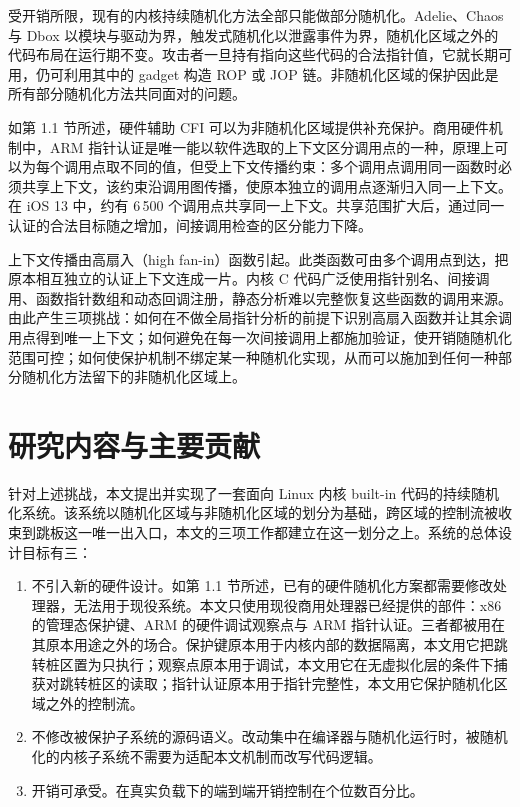 受开销所限，现有的内核持续随机化方法全部只能做部分随机化。Adelie、Chaos 与 Dbox 以模块与驱动为界，触发式随机化以泄露事件为界，随机化区域之外的代码布局在运行期不变。攻击者一旦持有指向这些代码的合法指针值，它就长期可用，仍可利用其中的 gadget 构造 ROP 或 JOP 链。非随机化区域的保护因此是所有部分随机化方法共同面对的问题。

如第 1.1 节所述，硬件辅助 CFI 可以为非随机化区域提供补充保护。商用硬件机制中，ARM 指针认证是唯一能以软件选取的上下文区分调用点的一种，原理上可以为每个调用点取不同的值，但受上下文传播约束：多个调用点调用同一函数时必须共享上下文，该约束沿调用图传播，使原本独立的调用点逐渐归入同一上下文。在 iOS 13 中，约有 6\,500 个调用点共享同一上下文\citep{liljestrand2019pac}。共享范围扩大后，通过同一认证的合法目标随之增加，间接调用检查的区分能力下降。

上下文传播由高扇入（high fan-in）函数引起。此类函数可由多个调用点到达，把原本相互独立的认证上下文连成一片。内核 C 代码广泛使用指针别名、间接调用、函数指针数组和动态回调注册，静态分析难以完整恢复这些函数的调用来源。由此产生三项挑战：如何在不做全局指针分析的前提下识别高扇入函数并让其余调用点得到唯一上下文；如何避免在每一次间接调用上都施加验证，使开销随随机化范围可控；如何使保护机制不绑定某一种随机化实现，从而可以施加到任何一种部分随机化方法留下的非随机化区域上。

\section{研究内容与主要贡献}

针对上述挑战，本文提出并实现了一套面向 Linux 内核 built-in 代码的持续随机化系统。该系统以随机化区域与非随机化区域的划分为基础，跨区域的控制流被收束到跳板这一唯一出入口，本文的三项工作都建立在这一划分之上。系统的总体设计目标有三：

\begin{enumerate}
    \item 不引入新的硬件设计。如第 1.1 节所述，已有的硬件随机化方案都需要修改处理器，无法用于现役系统。本文只使用现役商用处理器已经提供的部件：x86 的管理态保护键、ARM 的硬件调试观察点与 ARM 指针认证。三者都被用在其原本用途之外的场合。保护键原本用于内核内部的数据隔离，本文用它把跳转桩区置为只执行；观察点原本用于调试，本文用它在无虚拟化层的条件下捕获对跳转桩区的读取；指针认证原本用于指针完整性，本文用它保护随机化区域之外的控制流。
    \item 不修改被保护子系统的源码语义。改动集中在编译器与随机化运行时，被随机化的内核子系统不需要为适配本文机制而改写代码逻辑。
    \item 开销可承受。在真实负载下的端到端开销控制在个位数百分比。
\end{enumerate}

